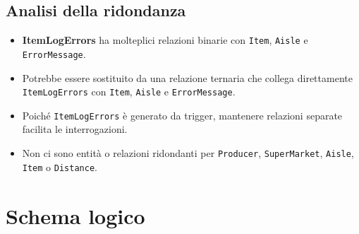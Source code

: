 \documentclass[a4paper,12pt]{article}
\begin{document}
\newpage
\subsection{Analisi della ridondanza}

\begin{itemize}
    \item \textbf{ItemLogErrors} ha molteplici relazioni binarie con \texttt{Item}, \texttt{Aisle} e \texttt{ErrorMessage}.
    \item Potrebbe essere sostituito da una relazione ternaria che collega direttamente \texttt{ItemLogErrors} con \texttt{Item}, \texttt{Aisle} e \texttt{ErrorMessage}.
    \item Poiché \texttt{ItemLogErrors} è generato da trigger, mantenere relazioni separate facilita le interrogazioni.
    \item Non ci sono entità o relazioni ridondanti per \texttt{Producer}, \texttt{SuperMarket}, \texttt{Aisle}, \texttt{Item} o \texttt{Distance}.
\end{itemize}

\newpage
\section{Schema logico}
\end{document}
